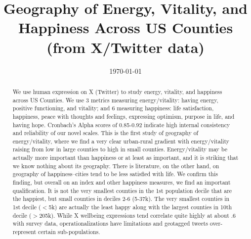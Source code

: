 \documentclass[10pt, letterpaper]{article}
\date{{}\today \hspace{.2in}\xxivtime}
\title{  
                                  Geography of Energy, Vitality, and Happiness
                                  Across US Counties\\(from X/Twitter data)
}
\author{
}
\begin{document}


\maketitle
\vspace{-.4in}
\begin{center}

\end{center}


\begin{abstract}
\noindent We use human expression on X (Twitter)  to study energy, vitality, and happiness
 across US Counties. We use 3 metrics measuring energy/vitality: having energy, positive
functioning, and vitality; and 6 measuring happiness: life
satisfaction, happiness, peace with thoughts and feelings, expressing optimism,
purpose in life, and having hope. Cronbach's Alpha scores of 0.85-0.92 indicate high internal
consistency and reliability of our novel scales. 
This is the first study of geography of energy/vitality, where we
find a very clear urban-rural gradient with energy/vitality raising from low in large counties to high in small
counties. Energy/vitality may be actually more important than happiness or at
least as important, and it is striking that we know nothing about its geography.  
% 
There is literature, on the other hand, on geography of happiness--cities tend
to be less satisfied with life. We confirm this finding, but overall on an
index and other happiness measures, we find an important qualification. It is
not the very smallest counties in the 1st population
decile that are the happiest, but small counties in deciles 2-6 (5-37k).
The very smallest counties in 1st decile ($<$5k) are actually the least happy along with the
largest counties in 10th decile ($>$205k).
%
While X wellbeing expressions tend correlate quite highly at about .6
with survey data, operationalizations have limitations and
geotagged tweets over-represent certain sub-populations.

\end{abstract}
\vspace{.15in} 
\vspace{.25in} 
\end{document}
